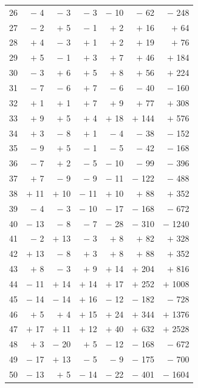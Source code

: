 \documentclass[11pt,a4paper]{book}
\begin{document}
\begin{center}
\begin{tabular}{|r|r|r|r|r|r|r|}
26 & $-$ 4 & $-$ 3 & $-$ 3 & $-$ 10 & $-$ 62 & $-$ 248 \\
27 & $-$ 2 & $+$ 5 & $-$ 1 & $+$ 2 & $+$ 16 & $+$ 64 \\
28 & $+$ 4 & $-$ 3 & $+$ 1 & $+$ 2 & $+$ 19 & $+$ 76 \\
29 & $+$ 5 & $-$ 1 & $+$ 3 & $+$ 7 & $+$ 46 & $+$ 184 \\
30 & $-$ 3 & $+$ 6 & $+$ 5 & $+$ 8 & $+$ 56 & $+$ 224 \\
31 & $-$ 7 & $-$ 6 & $+$ 7 & $-$ 6 & $-$ 40 & $-$ 160 \\
32 & $+$ 1 & $+$ 1 & $+$ 7 & $+$ 9 & $+$ 77 & $+$ 308 \\
33 & $+$ 9 & $+$ 5 & $+$ 4 & $+$ 18 & $+$ 144 & $+$ 576 \\
34 & $+$ 3 & $-$ 8 & $+$ 1 & $-$ 4 & $-$ 38 & $-$ 152 \\
35 & $-$ 9 & $+$ 5 & $-$ 1 & $-$ 5 & $-$ 42 & $-$ 168 \\
36 & $-$ 7 & $+$ 2 & $-$ 5 & $-$ 10 & $-$ 99 & $-$ 396 \\
37 & $+$ 7 & $-$ 9 & $-$ 9 & $-$ 11 & $-$ 122 & $-$ 488 \\
38 & $+$ 11 & $+$ 10 & $-$ 11 & $+$ 10 & $+$ 88 & $+$ 352 \\
39 & $-$ 4 & $-$ 3 & $-$ 10 & $-$ 17 & $-$ 168 & $-$ 672 \\
40 & $-$ 13 & $-$ 8 & $-$ 7 & $-$ 28 & $-$ 310 & $-$ 1240 \\
41 & $-$ 2 & $+$ 13 & $-$ 3 & $+$ 8 & $+$ 82 & $+$ 328 \\
42 & $+$ 13 & $-$ 8 & $+$ 3 & $+$ 8 & $+$ 88 & $+$ 352 \\
43 & $+$ 8 & $-$ 3 & $+$ 9 & $+$ 14 & $+$ 204 & $+$ 816 \\
44 & $-$ 11 & $+$ 14 & $+$ 14 & $+$ 17 & $+$ 252 & $+$ 1008 \\
45 & $-$ 14 & $-$ 14 & $+$ 16 & $-$ 12 & $-$ 182 & $-$ 728 \\
46 & $+$ 5 & $+$ 4 & $+$ 15 & $+$ 24 & $+$ 344 & $+$ 1376 \\
47 & $+$ 17 & $+$ 11 & $+$ 12 & $+$ 40 & $+$ 632 & $+$ 2528 \\
48 & $+$ 3 & $-$ 20 & $+$ 5 & $-$ 12 & $-$ 168 & $-$ 672 \\
49 & $-$ 17 & $+$ 13 & $-$ 5 & $-$ 9 & $-$ 175 & $-$ 700 \\
50 & $-$ 13 & $+$ 5 & $-$ 14 & $-$ 22 & $-$ 401 & $-$ 1604 \\
\hline
\end{tabular}
\end{center}
\end{document}
